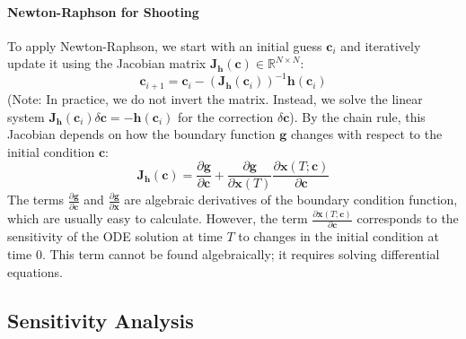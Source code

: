 \paragraph*{Newton-Raphson for Shooting}

To apply Newton-Raphson, we start with an initial guess $\mathbf{c}_i$ and iteratively update it using the Jacobian matrix $\mathbf{J}_{\mathbf{h}}(\mathbf{c}) \in \mathbb{R}^{N \times N}$:
\begin{equation}
    \mathbf{c}_{i+1} = \mathbf{c}_i - (\mathbf{J}_{\mathbf{h}}(\mathbf{c}_i))^{-1} \mathbf{h}(\mathbf{c}_i)
\end{equation}
(Note: In practice, we do not invert the matrix. Instead, we solve the linear system $\mathbf{J}_{\mathbf{h}}(\mathbf{c}_i) \delta \mathbf{c} = -\mathbf{h}(\mathbf{c}_i)$ for the correction $\delta \mathbf{c}$). By the chain rule, this Jacobian depends on how the boundary function $\mathbf{g}$ changes with respect to the initial condition $\mathbf{c}$:
\begin{equation}
    \mathbf{J}_{\mathbf{h}}(\mathbf{c}) = \frac{\partial \mathbf{g}}{\partial \mathbf{c}} + \frac{\partial \mathbf{g}}{\partial \mathbf{x}(T)} \frac{\partial \mathbf{x}(T; \mathbf{c})}{\partial \mathbf{c}}
\end{equation}
The terms $\frac{\partial \mathbf{g}}{\partial \mathbf{c}}$ and $\frac{\partial \mathbf{g}}{\partial \mathbf{x}}$ are algebraic derivatives of the boundary condition function, which are usually easy to calculate. However, the term $\frac{\partial \mathbf{x}(T; \mathbf{c})}{\partial \mathbf{c}}$ corresponds to the sensitivity of the ODE solution at time $T$ to changes in the initial condition at time $0$. This term cannot be found algebraically; it requires solving differential equations.

\subsection{Sensitivity Analysis}

